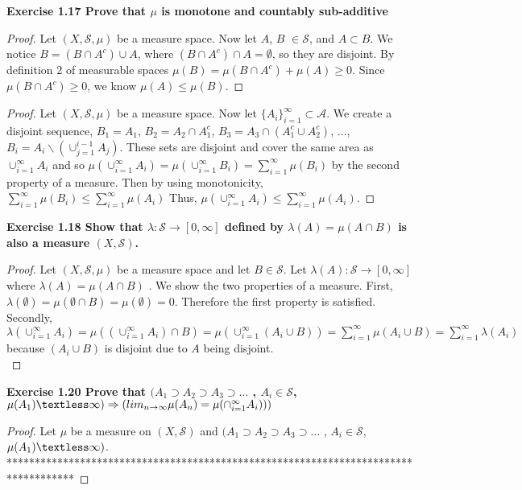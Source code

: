 \documentclass[letterpaper,12pt]{article}
\theoremstyle{definition}
\begin{document}
\noindent\textbf{Exercise 1.17
Prove that $\mu$ is monotone and countably sub-additive}\\
\begin{proof}  Let $( X, \mathcal{S}, \mu)$ be a measure space.
Now let $A$, $B$ $\in \mathcal{S}$, and $A \subset B$.  We notice $B=(B\cap A^c)\cup A$, where $(B\cap A^c) \cap A = \emptyset $, so they are disjoint.  By definition $2$ of measurable spaces $\mu (B) = \mu (B\cap A^c) + \mu (A) \ge 0$. Since $\mu(B\cap A^c)  \ge 0$, we know $\mu(A) \leq \mu(B)$.
\end{proof}

\begin{proof}
Let $( X, \mathcal{S}, \mu)$ be a measure space.  Now let $\{ A_i \}_{i=1}^\infty \subset \mathcal{A}$.  We create a disjoint sequence, $B_1 = A_1$, $B_2 = A_2 \cap A_1^c$, $B_3 = A_3 \cap (A_1^c \cup A_2^c)$, $\dots$, $B_i = A_i \smallsetminus (\cup_{j=1}^{i-1} A_j)$. These sets are disjoint and cover the same area as $\cup_{i=1}^\infty A_i$ and so $\mu (\cup_{i=1}^\infty A_i) = \mu (\cup_{i=1}^\infty B_i) = \sum_{i=1}^\infty \mu(B_i)$ by the second property of a measure.  Then by using monotonicity, $\sum_{i=1}^\infty \mu(B_i) \leq \sum_{i=1}^\infty \mu(A_i)$ Thus, $\mu (\cup_{i=1}^\infty A_i) \leq \sum_{i=1}^\infty \mu(A_i)$.
\end{proof}

\vspace{5mm}

\noindent\textbf{Exercise 1.18
Show that $\lambda : \mathcal{S} \rightarrow [0, \infty]$ defined by $\lambda(A) = \mu(A\cap B)$ is also a measure $(X, \mathcal{S})$.}\\
\begin{proof}
Let $(X, \mathcal{S}, \mu)$ be a measure space and let $B \in \mathcal{S}$.  Let $\lambda(A) : \mathcal{S} \rightarrow [0, \infty]$ where $\lambda(A) = \mu(A\cap B)$ .  We show the two properties of a measure.  First, $\lambda(\emptyset) = \mu(\emptyset\cap B) = \mu(\emptyset) = 0$.  Therefore the first property is satisfied.  Secondly, $\lambda(\cup_{i=1}^\infty A_i)=\mu((\cup_{i=1}^\infty A_i)\cap B) = \mu(\cup_{i=1}^\infty(A_i\cup B))=\sum_{i=1}^\infty \mu(A_i\cup B)=\sum_{i=1}^\infty \lambda(A_i)$ because $(A_i\cup B)$ is disjoint due to $A$ being disjoint.\\
\end{proof}

\noindent\textbf{Exercise 1.20
Prove that $( A_1 \supset A_2 \supset A_3 \supset \dots$ , $ A_i \in \mathcal{S}$, $\mu (A_1) \textless \infty ) \Rightarrow (lim_{n\to\infty} \mu(A_n) = \mu(\cap_{i=1}^\infty A_i)) )$}
\begin{proof}
Let $\mu$ be a measure on $(X, \mathcal{S})$ and $( A_1 \supset A_2 \supset A_3 \supset \dots$ , $ A_i \in \mathcal{S}$, $\mu (A_1) \textless \infty )$.  ************************************************************************************
\end{proof}
\end{document}
